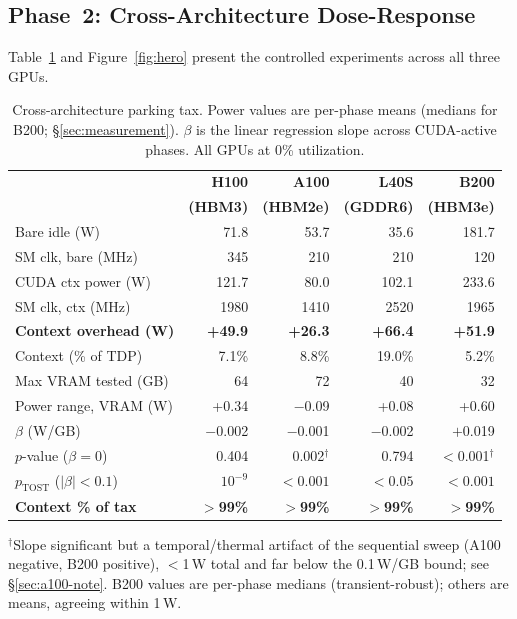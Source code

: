 \documentclass[sigconf,nonacm]{acmart}
\begin{document}
\subsection{Phase~2: Cross-Architecture Dose-Response}

Table~\ref{tab:cross} and Figure~\ref{fig:hero} present the controlled experiments across all three GPUs.

\begin{table}[t]
\caption{Cross-architecture parking tax. Power values are per-phase means (medians for B200; \S\ref{sec:measurement}). $\beta$ is the linear regression slope across CUDA-active phases. All GPUs at 0\% utilization.}
\label{tab:cross}
\scriptsize
\setlength{\tabcolsep}{3.5pt}
\begin{tabular}{lrrrr}
\toprule
 & \textbf{H100} & \textbf{A100} & \textbf{L40S} & \textbf{B200} \\
 & \textbf{(HBM3)} & \textbf{(HBM2e)} & \textbf{(GDDR6)} & \textbf{(HBM3e)} \\
\midrule
Bare idle (W) & 71.8 & 53.7 & 35.6 & 181.7 \\
SM clk, bare (MHz) & 345 & 210 & 210 & 120 \\
CUDA ctx power (W) & 121.7 & 80.0 & 102.1 & 233.6 \\
SM clk, ctx (MHz) & 1980 & 1410 & 2520 & 1965 \\
\midrule
\textbf{Context overhead (W)} & \textbf{+49.9} & \textbf{+26.3} & \textbf{+66.4} & \textbf{+51.9} \\
Context (\% of TDP) & 7.1\% & 8.8\% & 19.0\% & 5.2\% \\
\midrule
Max VRAM tested (GB) & 64 & 72 & 40 & 32 \\
Power range, VRAM (W) & +0.34 & $-$0.09 & +0.08 & +0.60 \\
$\beta$ (W/GB) & $-$0.002 & $-$0.001 & $-$0.002 & $+$0.019 \\
$p$-value ($\beta = 0$) & 0.404 & 0.002$^\dagger$ & 0.794 & $<$0.001$^\dagger$ \\
$p_{\text{TOST}}$ ($|\beta| < 0.1$) & $10^{-9}$ & $<0.001$ & $<0.05$ & $<0.001$ \\
\midrule
\textbf{Context \% of tax} & \textbf{$>$99\%} & \textbf{$>$99\%} & \textbf{$>$99\%} & \textbf{$>$99\%} \\
\bottomrule
\end{tabular}
\par\vspace{2pt}
\parbox{\columnwidth}{\footnotesize $^\dagger$Slope significant but a temporal/thermal artifact of the sequential sweep (A100 negative, B200 positive), $<$1\,W total and far below the 0.1\,W/GB bound; see \S\ref{sec:a100-note}. B200 values are per-phase medians (transient-robust); others are means, agreeing within 1\,W.}
\end{table}
\end{document}
